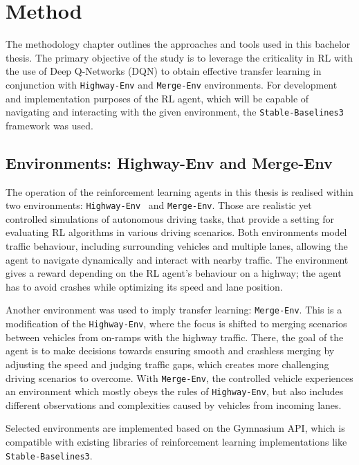 \section{Method}\label{chap:chap_3}

The methodology chapter outlines the approaches and tools used in this bachelor thesis. The primary objective of the study is to leverage the criticality in RL with the use of Deep Q-Networks (DQN) to obtain effective transfer learning in conjunction with \texttt{Highway-Env} and \texttt{Merge-Env} environments. For development and implementation purposes of the RL agent, which will be capable of navigating and interacting with the given environment, the \texttt{Stable-Baselines3} framework was used.

\subsection{Environments: Highway-Env and Merge-Env}

The operation of the reinforcement learning agents in this thesis is realised within two environments: \texttt{Highway-Env}~\cite{highway-env} and \texttt{Merge-Env}. Those are realistic yet controlled simulations of autonomous driving tasks, that provide a setting for evaluating RL algorithms in various driving scenarios. Both environments model traffic behaviour, including surrounding vehicles and multiple lanes, allowing the agent to navigate dynamically and interact with nearby traffic. The environment gives a reward depending on the RL agent's behaviour on a highway; the agent has to avoid crashes while optimizing its speed and lane position.

Another environment was used to imply transfer learning: \texttt{Merge-Env}. This is a modification of the \texttt{Highway-Env}, where the focus is shifted to merging scenarios between vehicles from on-ramps with the highway traffic. There, the goal of the agent is to make decisions towards ensuring smooth and crashless merging by adjusting the speed and judging traffic gaps, which creates more challenging driving scenarios to overcome. With \texttt{Merge-Env}, the controlled vehicle experiences an environment which mostly obeys the rules of \texttt{Highway-Env}, but also includes different observations and complexities caused by vehicles from incoming lanes.

Selected environments are implemented based on the Gymnasium API, which is compatible with existing libraries of reinforcement learning implementations like \texttt{Stable-Baselines3}.

